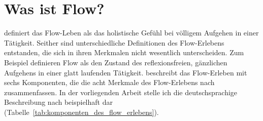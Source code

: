 

\section{Was ist Flow?} 

\label{sec:was_ist_flow}

\citet[S.~58f.]{Csikszentmihalyi2010} definiert das Flow-Leben als das holistische Gefühl bei völligem Aufgehen in einer Tätigkeit. Seither sind unterschiedliche Definitionen des Flow-Erlebens entstanden, die sich in ihren Merkmalen nicht wesentlich unterscheiden. Zum Beispiel definieren \citet[][S.~263]{Rheinberg2003} Flow als den Zustand des reflexionsfreien, gänzlichen Aufgehens in einer glatt laufenden Tätigkeit. \citet[S.~153ff.]{Rheinberg2008} beschreibt das Flow-Erleben mit sechs Komponenten, die die acht Merkmale des Flow-Erlebens nach \citet[S.~108ff.]{Csikszentmihalyi2010} zusammenfassen. In der vorliegenden Arbeit stelle ich die deutschsprachige Beschreibung nach \citet[]{Rheinberg2008} beispielhaft dar (Tabelle~\ref{tab:komponenten_des_flow_erlebens}). 
